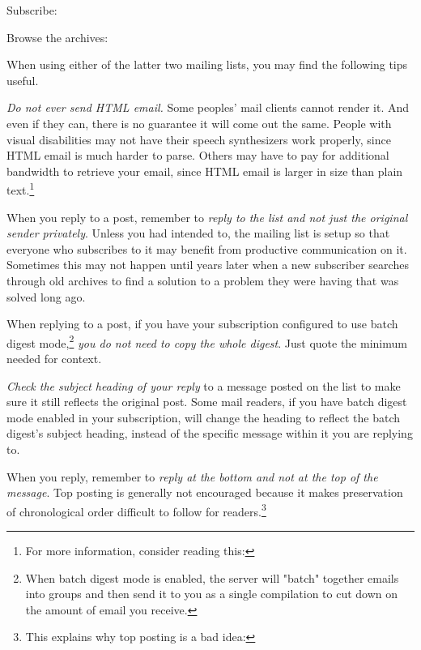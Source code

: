 \blank[2*big]
\startnarrower[3*left]
Subscribe:\crlf
{} 

\blank[2*big]
Browse the archives:\crlf
{}
\stopnarrower

When using either of the latter two mailing lists, you may find the following tips useful.

\startitemize[3]
\item
{\it Do not ever send HTML email.} Some peoples' mail clients cannot render it. And even if they can, there is no guarantee it will come out the same. People with visual disabilities may not have their speech synthesizers work properly, since HTML email is much harder to parse. Others may have to pay for additional bandwidth to retrieve your email, since HTML email is larger in size than plain text.\footnote{For more information, consider reading this: }

\item
When you reply to a post, remember to {\it reply to the list and not just the original sender privately}. Unless you had intended to, the mailing list is setup so that everyone who subscribes to it may benefit from productive communication on it. Sometimes this may not happen until years later when a new subscriber searches through old archives to find a solution to a problem they were having that was solved long ago.

\item
When replying to a post, if you have your subscription configured to use batch digest mode,\footnote{When batch digest mode is enabled, the server will "batch" together emails into groups and then send it to you as a single compilation to cut down on the amount of email you receive.} {\it you do not need to copy the whole digest}. Just quote the minimum needed for context.

\item
{\it Check the subject heading of your reply} to a message posted on the list to make sure it still reflects the original post. Some mail readers, if you have batch digest mode enabled in your subscription, will change the heading to reflect the batch digest's subject heading, instead of the specific message within it you are replying to.

\item
When you reply, remember to {\it reply at the bottom and not at the top of the message}. Top posting is generally not encouraged because it makes preservation of chronological order difficult to follow for readers.\footnote{This explains why top posting is a bad idea: }
\stopitemize


